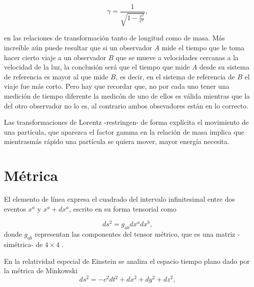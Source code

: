 \documentclass[11pt]{book}
\begin{document}
\begin{equation}
\gamma=\frac{1}{\sqrt{1-\frac{v^2}{c^2}}} ,
\label{fgamma}
\end{equation}



en las relaciones de transformación tanto de longitud como de masa. Más increíble aún puede resultar %
que si un observador $A$ mide el tiempo que le toma hacer cierto viaje a un observador $B$ que se mueve a velocidades cercanas a la velocidad de la luz, la conclusión será que el tiempo que mide $A$ desde su sistema de referencia es mayor al que mide $B$, es decir, en el sistema de referencia de $B$ el viaje fue más corto. Pero hay que recordar que, no por cada uno tener una medición  de tiempo diferente la medicón de uno de ellos es válida mientras que la del otro observador no lo es, al contrario ambos obsevadores están en lo correcto. 

Las transformaciones de Lorentz -restringen- de forma explícita el movimiento de una partícula, que aparezca el factor gamma en la relación de masa implica que mientrasmás rápido una partícula se quiera mover, mayor energía necesita.

\section{Métrica}

El elemento de línea expresa el cuadrado del intervalo infinitesimal entre dos eventos $x^a$ y $x^a+dx^a$, escrito en su forma tensorial como

\begin{equation}
ds^2=g_{ab}dx^adx^b ,
\label{linea}
\end{equation}
donde $g_{ab}$ representan las componentes del tensor métrico, que es una matriz -simétrica- de $4 \times 4$ .

En la relatividad especial de Einstein se analiza el espacio tiempo plano dado por la métrica de Minkowski 
\begin{equation}
ds^2=-c^2dt^2+dx^2+dy^2+dz^2 ,
\label{minkowski}
\end{equation}
\end{document}
